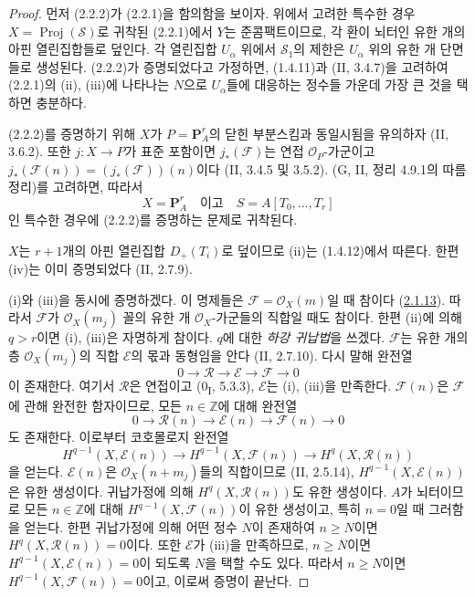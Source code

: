 \begin{proof}
먼저 (2.2.2)가 (2.2.1)을 함의함을 보이자. 위에서 고려한 특수한 경우
$X=\operatorname{Proj}(\mathcal S)$로 귀착된 (2.2.1)에서 $Y$는
준콤팩트이므로, 각 환이 뇌터인 유한 개의 아핀 열린집합들로 덮인다.
각 열린집합 $U_\alpha$ 위에서 $\mathcal S_1$의 제한은
$U_\alpha$ 위의 유한 개 단면들로 생성된다. (2.2.2)가 증명되었다고
가정하면, (1.4.11)과 (II, 3.4.7)을 고려하여 (2.2.1)의 (ii), (iii)에
나타나는 $N$으로 $U_\alpha$들에 대응하는 정수들 가운데 가장 큰 것을
택하면 충분하다.

(2.2.2)를 증명하기 위해 $X$가 $P=\mathbf P_A^r$의 닫힌 부분스킴과
동일시됨을 유의하자 (II, 3.6.2). 또한 $j:X\to P$가 표준 포함이면
$j_*(\mathcal F)$는 연접 $\mathcal O_P$-가군이고
$j_*(\mathcal F(n))=(j_*(\mathcal F))(n)$이다 (II, 3.4.5 및 3.5.2).
(G, II, 정리 4.9.1의 따름정리)를 고려하면, 따라서
\[
X=\mathbf P_A^r\quad\text{이고}\quad S=A[T_0,\ldots,T_r]
\]
인 특수한 경우에 (2.2.2)를 증명하는 문제로 귀착된다.

$X$는 $r+1$개의 아핀 열린집합 $D_+(T_i)$로 덮이므로 (ii)는
(1.4.12)에서 따른다. 한편 (iv)는 이미 증명되었다 (II, 2.7.9).

(i)와 (iii)을 동시에 증명하겠다. 이 명제들은
$\mathcal F=\mathcal O_X(m)$일 때 참이다
(\hyperref[III.2.1.13-fr]{2.1.13}). 따라서 $\mathcal F$가
$\mathcal O_X(m_j)$ 꼴의 유한 개 $\mathcal O_X$-가군들의 직합일 때도
참이다. 한편 (ii)에 의해 $q>r$이면 (i), (iii)은 자명하게 참이다.
$q$에 대한 \emph{하강 귀납법}을 쓰겠다. $\mathcal F$는 유한 개의
층 $\mathcal O_X(m_j)$의 직합 $\mathcal E$의 몫과 동형임을 안다
(II, 2.7.10). 다시 말해 완전열
\[
0\longrightarrow\mathcal R\longrightarrow\mathcal E
\longrightarrow\mathcal F\longrightarrow0
\]
이 존재한다. 여기서 $\mathcal R$은 연접이고 (0\textsubscript{I}, 5.3.3),
$\mathcal E$는 (i), (iii)을 만족한다. $\mathcal F(n)$은
$\mathcal F$에 관해 완전한 함자이므로, 모든 $n\in\mathbb Z$에 대해
완전열
\[
0\longrightarrow\mathcal R(n)\longrightarrow\mathcal E(n)
\longrightarrow\mathcal F(n)\longrightarrow0
\]
도 존재한다. 이로부터 코호몰로지 완전열
\[
H^{q-1}(X,\mathcal E(n))\longrightarrow
H^{q-1}(X,\mathcal F(n))\longrightarrow
H^q(X,\mathcal R(n))
\]
을 얻는다. $\mathcal E(n)$은 $\mathcal O_X(n+m_j)$들의 직합이므로
(II, 2.5.14), $H^{q-1}(X,\mathcal E(n))$은 유한 생성이다. 귀납가정에
의해 $H^q(X,\mathcal R(n))$도 유한 생성이다. $A$가 뇌터이므로
모든 $n\in\mathbb Z$에 대해 $H^{q-1}(X,\mathcal F(n))$이 유한
생성이고, 특히 $n=0$일 때 그러함을 얻는다. 한편 귀납가정에 의해
어떤 정수 $N$이 존재하여 $n\geq N$이면
$H^q(X,\mathcal R(n))=0$이다. 또한 $\mathcal E$가 (iii)을 만족하므로,
$n\geq N$이면 $H^{q-1}(X,\mathcal E(n))=0$이 되도록 $N$을 택할 수도
있다. 따라서 $n\geq N$이면
$H^{q-1}(X,\mathcal F(n))=0$이고, 이로써 증명이 끝난다.
\end{proof}

